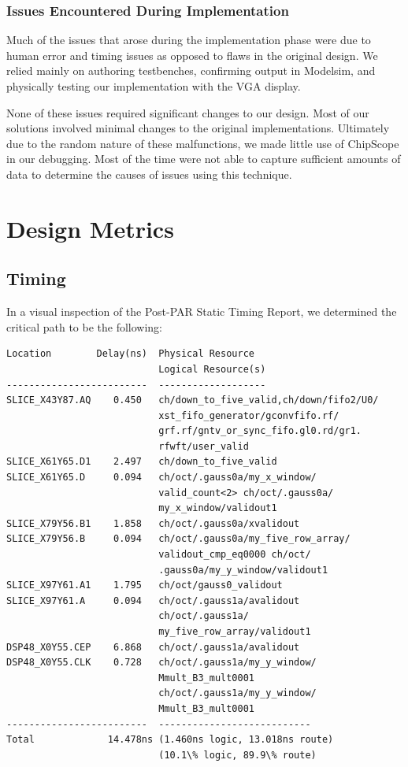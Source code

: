 \subsubsection{Issues Encountered During Implementation}

Much of the issues that arose during the implementation phase were due to 
human error and timing issues as opposed to flaws in the original design. We relied
mainly on authoring testbenches, confirming output in Modelsim, and physically 
testing our implementation with the VGA display.

None of these issues required significant changes to our design. Most of our solutions
involved minimal changes to the original implementations. Ultimately 
due to the random nature of these malfunctions, we made little use of ChipScope in our
debugging. Most of the time were not able to capture sufficient amounts of 
data to determine the causes of issues using this technique.

\section{Design Metrics}

\subsection{Timing}

In a visual inspection of the Post-PAR Static Timing Report, we determined the critical path to be
the following:

\noindent \begin{lstlisting}
Location        Delay(ns)  Physical Resource
                           Logical Resource(s)
-------------------------  -------------------
SLICE_X43Y87.AQ    0.450   ch/down_to_five_valid,ch/down/fifo2/U0/
                           xst_fifo_generator/gconvfifo.rf/
                           grf.rf/gntv_or_sync_fifo.gl0.rd/gr1.
                           rfwft/user_valid
SLICE_X61Y65.D1    2.497   ch/down_to_five_valid
SLICE_X61Y65.D     0.094   ch/oct/.gauss0a/my_x_window/
                           valid_count<2> ch/oct/.gauss0a/
                           my_x_window/validout1
SLICE_X79Y56.B1    1.858   ch/oct/.gauss0a/xvalidout
SLICE_X79Y56.B     0.094   ch/oct/.gauss0a/my_five_row_array/
                           validout_cmp_eq0000 ch/oct/
                           .gauss0a/my_y_window/validout1
SLICE_X97Y61.A1    1.795   ch/oct/gauss0_validout
SLICE_X97Y61.A     0.094   ch/oct/.gauss1a/avalidout
                           ch/oct/.gauss1a/
                           my_five_row_array/validout1
DSP48_X0Y55.CEP    6.868   ch/oct/.gauss1a/avalidout
DSP48_X0Y55.CLK    0.728   ch/oct/.gauss1a/my_y_window/
                           Mmult_B3_mult0001
                           ch/oct/.gauss1a/my_y_window/
                           Mmult_B3_mult0001
-------------------------  ---------------------------
Total             14.478ns (1.460ns logic, 13.018ns route)
                           (10.1\% logic, 89.9\% route)
\end{lstlisting}

